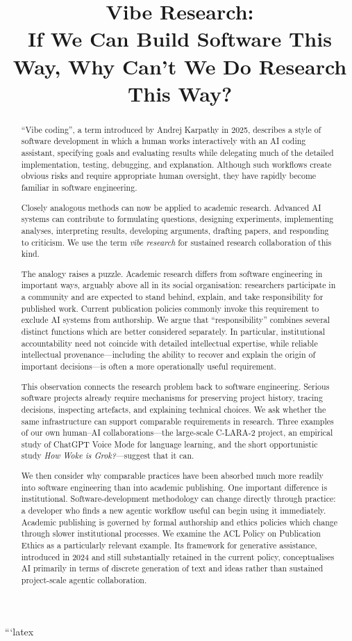 ```latex
\title{Vibe Research:\\
If We Can Build Software This Way, Why Can't We Do Research This Way?}

\begin{abstract}
``Vibe coding'', a term introduced by Andrej Karpathy in 2025, describes a style of software development in which a human works interactively with an AI coding assistant, specifying goals and evaluating results while delegating much of the detailed implementation, testing, debugging, and explanation. Although such workflows create obvious risks and require appropriate human oversight, they have rapidly become familiar in software engineering.

Closely analogous methods can now be applied to academic research. Advanced AI systems can contribute to formulating questions, designing experiments, implementing analyses, interpreting results, developing arguments, drafting papers, and responding to criticism. We use the term \emph{vibe research} for sustained research collaboration of this kind.

The analogy raises a puzzle. Academic research differs from software engineering in important ways, arguably above all in its social organisation: researchers participate in a community and are expected to stand behind, explain, and take responsibility for published work. Current publication policies commonly invoke this requirement to exclude AI systems from authorship. We argue that ``responsibility'' combines several distinct functions which are better considered separately. In particular, institutional accountability need not coincide with detailed intellectual expertise, while reliable intellectual provenance---including the ability to recover and explain the origin of important decisions---is often a more operationally useful requirement.

This observation connects the research problem back to software engineering. Serious software projects already require mechanisms for preserving project history, tracing decisions, inspecting artefacts, and explaining technical choices. We ask whether the same infrastructure can support comparable requirements in research. Three examples of our own human--AI collaborations---the large-scale C-LARA-2 project, an empirical study of ChatGPT Voice Mode for language learning, and the short opportunistic study \emph{How Woke is Grok?}---suggest that it can.

We then consider why comparable practices have been absorbed much more readily into software engineering than into academic publishing. One important difference is institutional. Software-development methodology can change directly through practice: a developer who finds a new agentic workflow useful can begin using it immediately. Academic publishing is governed by formal authorship and ethics policies which change through slower institutional processes. We examine the ACL Policy on Publication Ethics as a particularly relevant example. Its framework for generative assistance, introduced in 2024 and still substantially retained in the current policy, conceptualises AI primarily in terms of discrete generation of text and ideas rather than sustained project-scale agentic collaboration.


\end{abstract}
